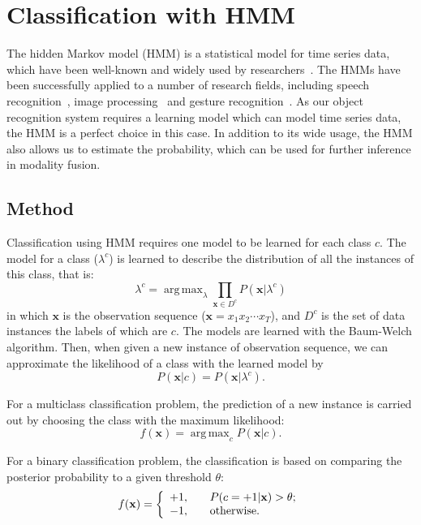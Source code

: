 \documentclass[letterpaper, 10 pt, conference]{ieeeconf}
\DeclareMathOperator*{\argmax}{arg\,max}
\begin{document}
\section{Classification with HMM}
The hidden Markov model (HMM) is a statistical model for time series data, which have been well-known and widely used by researchers~\cite{rabiner_tutorial_1989}\cite{rabiner_fundamentals_1993}. The HMMs have been successfully applied to a number of research fields, including speech recognition~\cite{rabiner_fundamentals_1993}\cite{baker_dragon_1975}, image processing~\cite{chen_off-line_1994} and gesture recognition~\cite{mitra_gesture_2007}. As our object recognition system requires a learning model which can model time series data, the HMM is a perfect choice in this case. In addition to its wide usage, the HMM also allows us to estimate the probability, which can be used for further inference in modality fusion.

\subsection{Method}
Classification using HMM requires one model to be learned for each class $c$. The model for a class ($\lambda^c$) is learned to describe the distribution of all the instances of this class, that is:
\begin{equation}
  \lambda^c = \argmax_{\lambda} \prod_{\mathbf{x} \in D^c} P(\mathbf{x}|\lambda^c)
\end{equation}
in which $\mathbf{x}$ is the observation sequence ($\mathbf{x} = x_1 x_2 \cdots x_T$), and $D^c$ is the set of data instances the labels of which are $c$. The models are learned with the Baum-Welch algorithm. Then, when given a new instance of observation sequence, we can approximate the likelihood of a class with the learned model by
\begin{equation}
  P(\mathbf{x}|c) = P(\mathbf{x}|\lambda^c) .
\end{equation}

For a multiclass classification problem, the prediction of a new instance is carried out by choosing the class with the maximum likelihood:
\begin{equation}
  \label{eq:classif_s}
  f(\mathbf{x}) = \argmax_{c} P(\mathbf{x}|c) .
\end{equation}

For a binary classification problem, the classification is based on comparing the posterior probability to a given threshold $\theta$:
\begin{equation}
  \label{eq:classif_g}
  f(\mathbf{x}) =
  \left\{ \begin{array}{l l} +1, & \quad P(c=+1|\mathbf{x}) > \theta; \\ -1, & \quad \text{otherwise.}
  \end{array} \right.
\end{equation}
\end{document}
